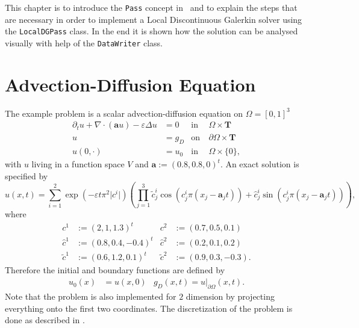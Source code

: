\newcommand{\velo}{\mathbf{a}}
\newcommand{\timedomain}{\mathbf{T}}
This chapter is to introduce the \texttt{Pass} concept in \Fem\ and to explain
the steps that are necessary in order to implement a Local Discontinuous
Galerkin solver using the \texttt{LocalDGPass} class. In the end it is
shown how the solution can be analysed visually with help of the
\texttt{DataWriter} class.

\section{Advection-Diffusion Equation}

The example problem is a scalar advection-diffusion equation on $\Omega =
[0,1]^3$
\begin{equation}
  \label{eq:advectdiff}
  \begin{aligned}
    \partial_{t} u + \nabla \cdot (\velo u) - \varepsilon \Delta u 
    {}          &=  0            & \mbox{in}&\ \Omega \times \timedomain \\
    u           &=  g_{D}        & \mbox{on}&\ \partial\Omega \times \timedomain \\
    u(0,\cdot)  &=  u_{0}        & \mbox{in}&\ \Omega \times \{0\},
  \end{aligned}
\end{equation}
with $u$ living in a function space $V$ and $\velo:=(0.8,0.8,0)^t$. An exact
solution is specified by
\newcommand{\ccos}{\tilde{c}}
\newcommand{\csin}{\hat{c}}
\begin{equation}
  u(x,t) = \sum_{i=1}^{2} \exp(-\varepsilon t \pi^2 |{c^{i}|})
  \left(\prod_{j=1}^{3} \ccos_{j}^{i}\cos(c_{j}^{i}\pi(x_{j}-\velo_{j} t)) + 
  {}              \csin_{j}^{i}\sin(c_{j}^{i}\pi(x_{j}-\velo_{j} t)) \right),
  \label{eq:exactsolution}
\end{equation}
where
\begin{align}
  c^{1}    &:=(2,1,1.3)^{t}      & c^{2}&:=(0.7,0.5,0.1) \\
  \csin^{1}&:=(0.8,0.4,-0.4)^{t} & \csin^{2} &:= (0.2,0.1,0.2) \\
  \ccos^{1}&:=(0.6,1.2,0.1)^{t}  & \ccos^{2} &:= (0.9,0.3,-0.3).
  \label{eq:constants}
\end{align}
Therefore the initial and boundary functions are defined by
\begin{align}
  u_{0}(x) &= u(x,0) & g_{D}(x,t) = u|_{\partial\Omega}(x,t).
  \label{eq:initialboundary}
\end{align}
Note that the problem is also implemented for $2$ dimension by projecting
everything onto the first two coordinates. 
The discretization of the problem is done as described in
\cite[ch.4]{wissrechnen}.

